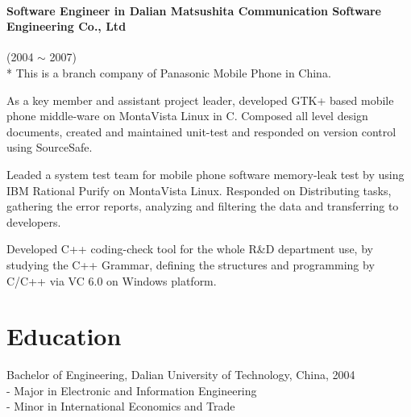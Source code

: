 \documentclass[a4paper,11pt]{article}
\begin{document}
\paragraph{Software Engineer in Dalian Matsushita Communication Software Engineering Co., Ltd} (2004 $\sim$ 2007) \\*
This is a branch company of Panasonic Mobile Phone in China.
\begin{itemize*}
    \setlength\itemsep{0.4em}
  \item As a key member and assistant project leader, developed GTK+ based mobile phone middle-ware on MontaVista Linux in C. Composed all level design documents, created and maintained unit-test and responded on version control using SourceSafe.
  \item Leaded a system test team for mobile phone software memory-leak test by using IBM Rational Purify on MontaVista Linux. Responded on Distributing tasks, gathering the error reports, analyzing and filtering the data and transferring to developers.
  \item Developed C++ coding-check tool for the whole R\&D department use, by studying the C++ Grammar, defining the structures and programming by C/C++ via VC 6.0 on Windows platform.
\end{itemize*}

\section*{Education}
Bachelor of Engineering, Dalian University of Technology, China, 2004 \\
 - Major in Electronic and Information Engineering \\
 - Minor in International Economics and Trade \\
\end{document}
